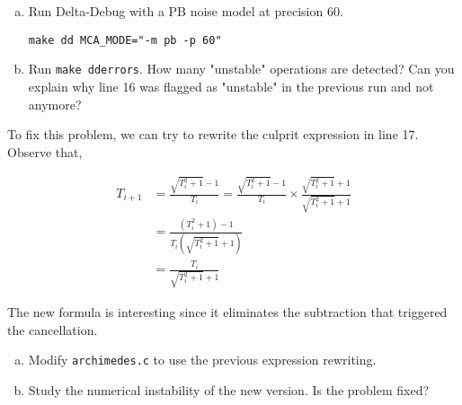 \begin{question}
  \begin{enumerate}[(a)]
    \item Run Delta-Debug with a PB noise model at precision 60.
      \begin{verbatim}
make dd MCA_MODE="-m pb -p 60"
      \end{verbatim}
    \item Run \texttt{make dderrors}. How many "unstable" operations are detected?
      Can you explain why line 16 was flagged as "unstable" in the previous run and not anymore?
  \end{enumerate}
\end{question}

To fix this problem, we can try to rewrite the culprit expression in line 17.
Observe that,

\begin{align*}
  T_{i+1} &= \frac{\sqrt{T_i^2+1} - 1}{T_i} = \frac{\sqrt{T_i^2+1} - 1}{T_i} \times \frac{\sqrt{T_i^2+1} + 1}{\sqrt{T_i^2+1} + 1} \\
          &= \frac{(T_i^2 + 1) - 1}{T_i(\sqrt{T_i^2+1} + 1)} \\
          &= \frac{T_i}{\sqrt{T_i^2+1} + 1}
\end{align*}

The new formula is interesting since it eliminates the subtraction that triggered the cancellation.

\begin{question}
  \begin{enumerate}[(a)]
    \item Modify \texttt{archimedes.c} to use the previous expression rewriting.
    \item Study the numerical instability of the new version. Is the problem fixed?
  \end{enumerate}
\end{question}
